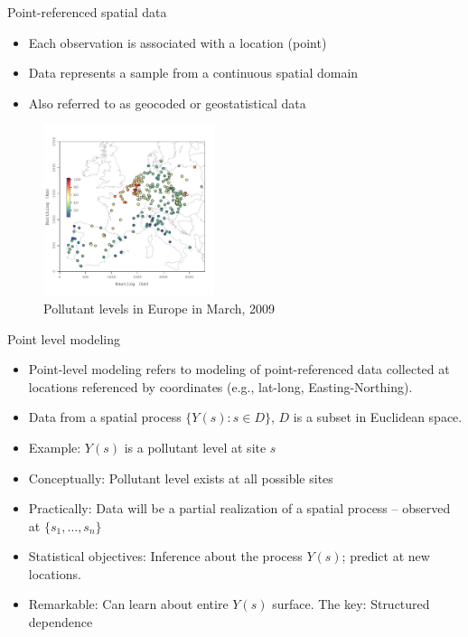 \documentclass[xcolor=pdftex,dvipsnames,table,numbers,hyperref={pdfpagelabels=false},compress]{beamer}
\newcommand{\blue}[1]{{\color{RoyalBlue!90} #1}}
\newcommand{\red}[1]{{\color{Red} #1}}
\begin{document}
\begin{frame}{Point-referenced spatial data}
	\begin{itemize}
				\item Each observation  is associated with a location (point) 
				\item Data represents a sample from a continuous spatial domain
				\item Also referred to as \alert {geocoded} or \alert {geostatistical} data
			\end{itemize}

		\begin{figure}
			\begin{center}
				\vskip -5mm\includegraphics[width=5cm]{figures/march-obs.pdf}
				\caption{Pollutant levels in Europe in March, 2009}
			\end{center}
		\end{figure}
\end{frame}

\begin{frame}{Point level modeling}
	\begin{itemize}
		\item \alert{Point-level modeling} refers to modeling of point-referenced data collected at locations referenced by \red{coordinates} (e.g., lat-long, Easting-Northing). %
		
		\item Data from a spatial process $\{Y(s): s \in D\}$, $D$ is a subset in
		Euclidean space. %
		
		\item \blue{Example:} $Y(s)$ is a \red{pollutant level} at site $s$ %
		
		\item \red{Conceptually:} Pollutant level exists at all possible sites %
		
		\item \blue{Practically:} Data will be a partial realization of a spatial process -- observed at $\{s_1,\ldots,s_n\}$ %
		
		\item \red{Statistical objectives:} \blue{Inference} about the process $Y(s)$; \blue{predict} at new locations.
		
		\item \red{Remarkable:} Can learn about entire $Y(s)$ surface.  The \blue{key:} Structured dependence
	\end{itemize}
\end{frame}
\end{document}
